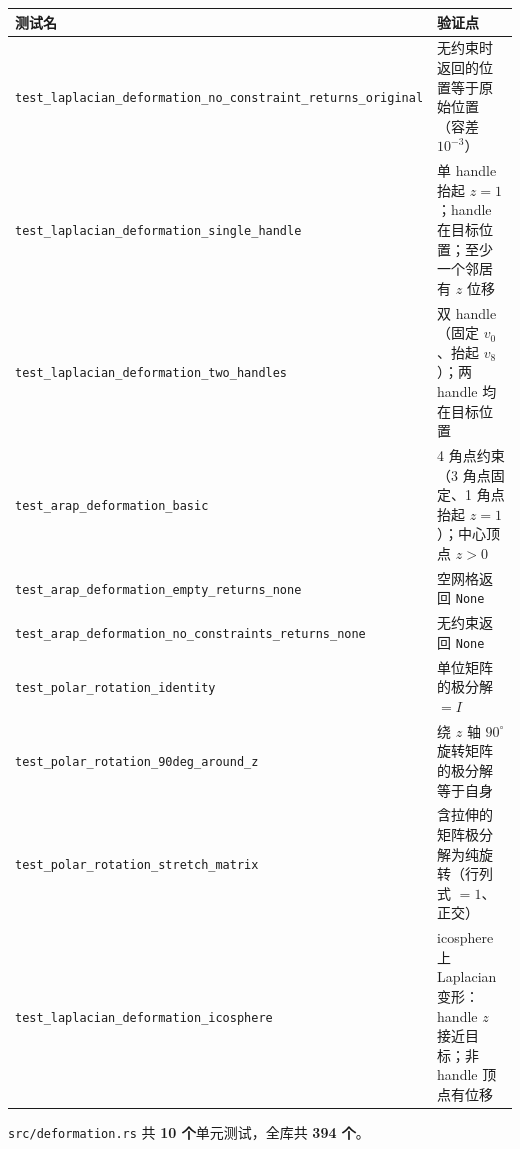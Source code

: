 \documentclass[11pt,a4paper]{article}
\begin{document}
\begin{center}
\renewcommand{\arraystretch}{1.18}
\begin{tabular}{@{}p{6.5cm}p{8.2cm}@{}}
  \toprule
  \textbf{测试名} & \textbf{验证点} \\
  \midrule
  \texttt{test\_laplacian\_deformation\_no\_constraint\_returns\_original}
    & 无约束时返回的位置等于原始位置（容差 $10^{-3}$） \\
  \texttt{test\_laplacian\_deformation\_single\_handle}
    & 单 handle 抬起 $z=1$；handle 在目标位置；至少一个邻居有 $z$ 位移 \\
  \texttt{test\_laplacian\_deformation\_two\_handles}
    & 双 handle（固定 $v_0$、抬起 $v_8$）；两 handle 均在目标位置 \\
  \texttt{test\_arap\_deformation\_basic}
    & 4 角点约束（3 角点固定、1 角点抬起 $z=1$）；中心顶点 $z > 0$ \\
  \texttt{test\_arap\_deformation\_empty\_returns\_none}
    & 空网格返回 \texttt{None} \\
  \texttt{test\_arap\_deformation\_no\_constraints\_returns\_none}
    & 无约束返回 \texttt{None} \\
  \texttt{test\_polar\_rotation\_identity}
    & 单位矩阵的极分解 $= I$ \\
  \texttt{test\_polar\_rotation\_90deg\_around\_z}
    & 绕 $z$ 轴 $90^\circ$ 旋转矩阵的极分解等于自身 \\
  \texttt{test\_polar\_rotation\_stretch\_matrix}
    & 含拉伸的矩阵极分解为纯旋转（行列式 $= 1$、正交） \\
  \texttt{test\_laplacian\_deformation\_icosphere}
    & icosphere 上 Laplacian 变形：handle $z$ 接近目标；非 handle 顶点有位移 \\
  \bottomrule
\end{tabular}
\end{center}

\texttt{src/deformation.rs} 共 \textbf{10 个}单元测试，全库共 \textbf{394 个}。
\end{document}
